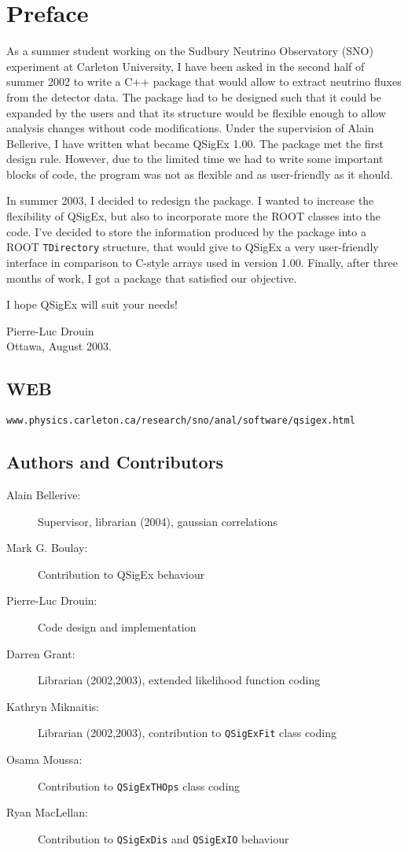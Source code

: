 \chapter*{Preface}
As a summer student working on the Sudbury Neutrino Observatory (SNO) experiment
at Carleton University, I have been asked in the second half of summer 2002 to
write a C++ package that would allow to extract neutrino fluxes from the
detector data. The package had to be designed such that it could be expanded by
the users and that its structure would be flexible enough to allow analysis
changes without code modifications. Under the supervision of Alain Bellerive, I
have written what became QSigEx 1.00. The package met the first design rule.
However, due to the limited time we had to write some important blocks of code,
the program was not as flexible and as user-friendly as it should.

In summer 2003, I decided to redesign the package. I wanted to increase the
flexibility of QSigEx, but also to incorporate more the ROOT classes into the
code. I've decided to store the information produced by the package into a ROOT
\texttt{TDirectory} structure, that would give to QSigEx a very user-friendly interface
in comparison to C-style arrays used in version 1.00. Finally, after three
months of work, I got a package that satisfied our objective.

I hope QSigEx will suit your needs!

\begin{center}
Pierre-Luc Drouin\\
Ottawa, August 2003.
\end{center}

\section*{WEB}

\texttt{www.physics.carleton.ca/research/sno/anal/software/qsigex.html}

\section*{Authors and Contributors}
\begin{description}
\item[Alain Bellerive:] Supervisor, librarian (2004), gaussian correlations
\item[Mark G. Boulay:] Contribution to QSigEx behaviour
\item[Pierre-Luc Drouin:] Code design and implementation
\item[Darren Grant:] Librarian (2002,2003), extended likelihood function coding
\item[Kathryn Miknaitis:] Librarian (2002,2003), contribution to \texttt{QSigExFit} class coding
\item[Osama Moussa:] Contribution to \texttt{QSigExTHOps} class coding
\item[Ryan MacLellan:] Contribution to \texttt{QSigExDis} and \texttt{QSigExIO} behaviour
\end{description}
